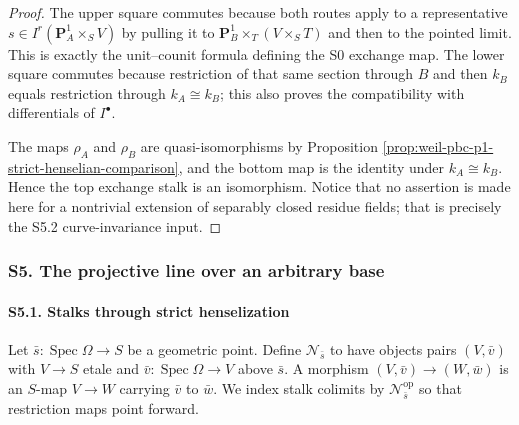 \begin{proof}
The upper square commutes because both routes apply to a representative
$s\in I^r(\mathbf P^1_A\times_SV)$ by pulling it to
$\mathbf P^1_B\times_T(V\times_ST)$ and then to the pointed limit.  This is
exactly the unit--counit formula defining the S0 exchange map.  The lower
square commutes because restriction of that same section through $B$ and
then $k_B$ equals restriction through $k_A\cong k_B$; this also proves the
compatibility with differentials of $I^\bullet$.

The maps $\rho_A$ and $\rho_B$ are quasi-isomorphisms by Proposition
\ref{prop:weil-pbc-p1-strict-henselian-comparison}, and the bottom map is the
identity under $k_A\cong k_B$.  Hence the top exchange stalk is an
isomorphism.  Notice that no assertion is made here for a nontrivial
extension of separably closed residue fields; that is precisely the S5.2
curve-invariance input.
\end{proof}



\subsubsection{S5. The projective line over an arbitrary base}

\paragraph{S5.1. Stalks through strict henselization}

\begin{definition}
\label{def:weil-pbc-pointed-etale-neighbourhoods}
\uses{}
Let $\bar s:\operatorname{Spec}\Omega\to S$ be a geometric point.  Define
$\mathcal N_{\bar s}$ to have objects pairs $(V,\bar v)$ with $V\to S$
etale and $\bar v:\operatorname{Spec}\Omega\to V$ above $\bar s$.
A morphism $(V,\bar v)\to(W,\bar w)$ is an $S$-map $V\to W$ carrying
$\bar v$ to $\bar w$.  We index stalk colimits by
$\mathcal N_{\bar s}^{\mathrm{op}}$ so that restriction maps point forward.
\end{definition}

